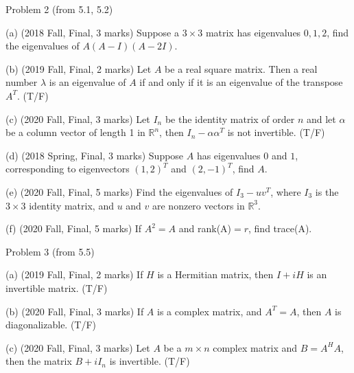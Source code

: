 \documentclass{beamer}
\begin{document}
\begin{frame}{Problem 2 (from 5.1, 5.2)}
\begin{example}

    (a) (2018 Fall, Final, 3 marks) Suppose a $3\times 3$ matrix has eigenvalues $0, 1, 2$, find the eigenvalues of $A(A-I)(A-2I)$.

    \vspace{3pt}
    (b) (2019 Fall, Final, 2 marks) Let $A$ be a real square matrix. Then a real number $\lambda$ is an eigenvalue of $A$ if and only if it is an eigenvalue of the transpose $A^T$. (T/F)

    \vspace{3pt}
    (c) (2020 Fall, Final, 3 marks) Let $I_n$ be the identity matrix of order $n$ and let $\alpha$ be a column vector of length 1 in $\mathbb{R}^n$, then $I_n-\alpha \alpha ^T$ is not invertible. (T/F)

    \vspace{3pt}
    (d) (2018 Spring, Final, 3 marks) Suppose $A$ has eigenvalues $0$ and $1$, corresponding to eigenvectors $(1,2)^T$ and $(2,-1)^T$, find $A$.

    \vspace{3pt}
    (e) (2020 Fall, Final, 5 marks) Find the eigenvalues of $I_3-uv^T$, where $I_3$ is the $3\times 3$ identity matrix, and $u$ and $v$ are nonzero vectors in $\mathbb{R}^3$.

    \vspace{3pt}
    (f) (2020 Fall, Final, 5 marks) If $A^2=A$ and rank(A)$=r$, find trace(A).
\end{example}
\end{frame}

\begin{frame}{Problem 3 (from 5.5)}
\begin{example}

    (a) (2019 Fall, Final, 2 marks) If $H$ is a Hermitian matrix, then $I+iH$ is an invertible matrix. (T/F)

    \vspace{3pt}
    (b) (2020 Fall, Final, 3 marks) If $A$ is a complex matrix, and $A^T=A$, then $A$ is diagonalizable. (T/F)

    \vspace{3pt}
    (c) (2020 Fall, Final, 3 marks) Let $A$ be a $m\times n$ complex matrix and $B=A^HA$, then the matrix $B+iI_n$ is invertible. (T/F)
\end{example}
\end{frame}
\end{document}
